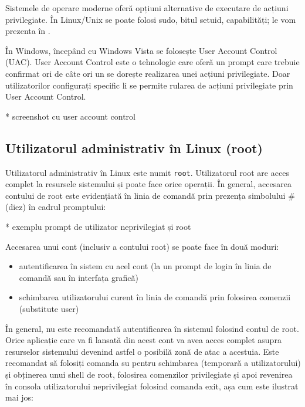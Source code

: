 Sistemele de operare moderne oferă opțiuni alternative de executare de acțiuni
privilegiate. În Linux/Unix se poate folosi sudo, bitul setuid, capabilități; le
vom prezenta în .

În Windows, începând cu Windows Vista se folosește User Account Control
(UAC). User Account Control este o tehnologie
care oferă un prompt care trebuie confirmat ori de câte ori un se dorește
realizarea unei acțiuni privilegiate. Doar utilizatorilor configurați specific
li se permite rularea de acțiuni privilegiate prin User Account Control.

* screenshot cu user account control

\subsection{Utilizatorul administrativ în Linux (root)}
\label{sec:users-superuser-root}

Utilizatorul administrativ în Linux este numit \texttt{root}. Utilizatorul root
are acces complet la resursele sistemului și poate face orice operații. În
general, accesarea contului de root este evidențiată în linia de comandă prin
prezența simbolului \# (diez) în cadrul promptului:

* exemplu prompt de utilizator neprivilegiat și root

Accesarea unui cont (inclusiv a contului root) se poate face în două moduri:

\begin{itemize}
	\item autentificarea în sistem cu acel cont (la un prompt de login în
		linia de comandă sau în interfața grafică)
	\item schimbarea utilizatorului curent în linia de comandă prin
		folosirea comenzii  (substitute user)
\end{itemize}

În general, nu este recomandată autentificarea în sistemul folosind contul de
root. Orice aplicație care va fi lansată din acest cont va avea acces complet
asupra resurselor sistemului devenind astfel o posibilă zonă de atac a acestuia.
Este recomandat să folosiți comanda su pentru schimbarea (temporară a
utilizatorului) și obținerea unui shell de root, folosirea comenzilor
privilegiate și apoi revenirea în consola utilizatorului neprivilegiat folosind
comanda exit, așa cum este ilustrat mai jos:

